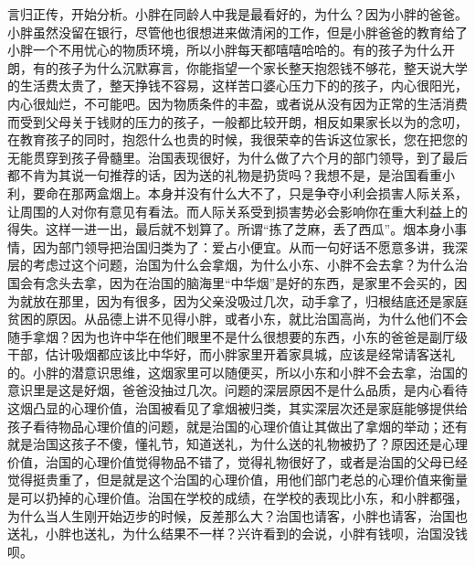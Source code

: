 言归正传，开始分析。小胖在同龄人中我是最看好的，为什么？因为小胖的爸爸。小胖虽然没留在银行，尽管他也很想进来做清闲的工作，但是小胖爸爸的教育给了小胖一个不用忧心的物质环境，所以小胖每天都嘻嘻哈哈的。有的孩子为什么开朗，有的孩子为什么沉默寡言，你能指望一个家长整天抱怨钱不够花，整天说大学的生活费太贵了，整天挣钱不容易，这样苦口婆心压力下的的孩子，内心很阳光，内心很灿烂，不可能吧。因为物质条件的丰盈，或者说从没有因为正常的生活消费而受到父母关于钱财的压力的孩子，一般都比较开朗，相反如果家长以为的念叨，在教育孩子的同时，抱怨什么也贵的时候，我很荣幸的告诉这位家长，您在把您的无能贯穿到孩子骨髓里。治国表现很好，为什么做了六个月的部门领导，到了最后都不肯为其说一句推荐的话，因为送的礼物是扔货吗？我想不是，是治国看重小利，要命在那两盒烟上。本身并没有什么大不了，只是争夺小利会损害人际关系，让周围的人对你有意见有看法。而人际关系受到损害势必会影响你在重大利益上的得失。这样一进一出，最后就不划算了。所谓“拣了芝麻，丢了西瓜”。烟本身小事情，因为部门领导把治国归类为了：爱占小便宜。从而一句好话不愿意多讲，我深层的考虑过这个问题，治国为什么会拿烟，为什么小东、小胖不会去拿？为什么治国会有念头去拿，因为在治国的脑海里“中华烟”是好的东西，是家里不会买的，因为就放在那里，因为有很多，因为父亲没吸过几次，动手拿了，归根结底还是家庭贫困的原因。从品德上讲不见得小胖，或者小东，就比治国高尚，为什么他们不会随手拿烟？因为也许中华在他们眼里不是什么很想要的东西，小东的爸爸是副厅级干部，估计吸烟都应该比中华好，而小胖家里开着家具城，应该是经常请客送礼的。小胖的潜意识思维，这烟家里可以随便买，所以小东和小胖不会去拿，治国的意识里是这是好烟，爸爸没抽过几次。问题的深层原因不是什么品质，是内心看待这烟凸显的心理价值，治国被看见了拿烟被归类，其实深层次还是家庭能够提供给孩子看待物品心理价值的问题，就是治国的心理价值让其做出了拿烟的举动；还有就是治国这孩子不傻，懂礼节，知道送礼，为什么送的礼物被扔了？原因还是心理价值，治国的心理价值觉得物品不错了，觉得礼物很好了，或者是治国的父母已经觉得挺贵重了，但是就是这个治国的心理价值，用他们部门老总的心理价值来衡量是可以扔掉的心理价值。治国在学校的成绩，在学校的表现比小东，和小胖都强，为什么当人生刚开始迈步的时候，反差那么大？治国也请客，小胖也请客，治国也送礼，小胖也送礼，为什么结果不一样？兴许看到的会说，小胖有钱呗，治国没钱呗。


